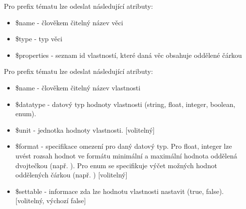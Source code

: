 Pro prefix tématu  lze odeslat následující atributy:
\begin{itemize}
    \item \$name - člověkem čitelný název věci
    \item \$type - typ věci
    \item \$properties - seznam id vlastností, které daná věc obsahuje oddělené čárkou
\end{itemize}

Pro prefix tématu  lze odeslat následující atributy:
\begin{itemize}
    \item \$name - člověkem čitelný název vlastnosti
    \item \$datatype - datový typ hodnoty vlastnosti (string, float, integer, boolean, enum).
    \item \$unit - jednotka hodnoty vlastnosti. [volitelný]
    \item \$format - specifikace omezení pro daný datový typ. Pro float, integer lze uvést rozsah hodnot ve formátu minimální a maximální hodnota oddělená dvojtečkou (např. ). Pro enum se specifikuje výčet možných hodnot oddělených čárkou (např. ) [volitelný]
    \item \$settable - informace zda lze hodnotu vlastnosti nastavit (true, false). [volitelný, výchozí false]
\end{itemize}



